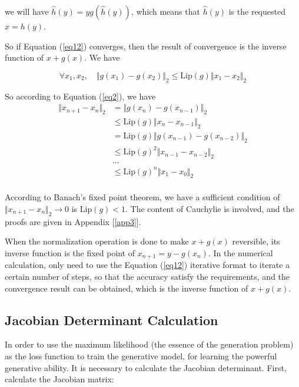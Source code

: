 \documentclass[final]{cvpr}
\begin{document}
we will have $\hat{h}(y)=yg\left(\hat{h}(y)\right)$, which means that $\hat{h}(y)$ is the requested $ x = h(y)$.

So if Equation (\ref{eq12}) converges, then the result of convergence is the inverse function of $x+g(x)$. We have

\begin{equation}
   \forall x_1,x_2,\quad\Vert g(x_1)-g(x_2)\Vert_2\leq \text{Lip}(g)\Vert x_1-x_2\Vert_2
\end{equation}

So according to Equation (\ref{eq2}), we have
\begin{equation}
   \begin{aligned}
      \Vert x_{n+1}-x_{n}\Vert_2&=\Vert g(x_{n})-g(x_{n-1})\Vert_2\\
&\leq \text{Lip}(g)\Vert x_{n}-x_{n-1}\Vert_2\\
& = \text{Lip}(g)\Vert g(x_{n-1})-g(x_{n-2})\Vert_2\\
&\leq \text{Lip}(g)^2\Vert x_{n-1}-x_{n-2}\Vert_2\\
&\dots\\
&\leq \text{Lip}(g)^n\Vert x_{1}-x_{0}\Vert_2\\
   \end{aligned}
\end{equation}

According to Banach's fixed point theorem, we have a sufficient condition of $\Vert x_{n+1}-x_{n}\Vert_2\to 0$ is $\text{Lip}(g) <1$. The content of Cauchylie is involved, and the proofs are given in Appendix [\ref{app3}].

When the normalization operation is done to make $x+g(x)$ reversible, its inverse function is the fixed point of $x_{n+1}=y-g(x_n)$. In the numerical calculation, only need to use the Equation (\ref{eq12}) iterative format to iterate a certain number of steps, so that the accuracy satisfy the requirements, and the convergence result can be obtained, which is the inverse function of $x+g(x)$.



\subsection{Jacobian Determinant Calculation}\label{sec33}
In order to use the maximum likelihood (the essence of the generation problem) as the loss function to train the generative model, for learning the powerful generative ability. It is necessary to calculate the Jacobian determinant. First, calculate the Jacobian matrix:
\end{document}
